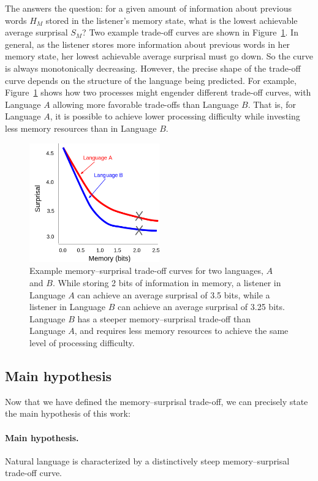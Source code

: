 The  answers the question: for a given amount of information about previous words $H_M$ stored in the listener's memory state, what is the lowest achievable average surprisal $S_M$? Two example trade-off curves are shown in Figure~\ref{fig:examples}. In general, as the listener stores more information about previous words in her memory state, her lowest achievable average surprisal must go down. So the curve is always monotonically decreasing. However, the precise shape of the trade-off curve depends on the structure of the language being predicted. For example, Figure~\ref{fig:examples} shows how two processes might engender different trade-off curves, with Language $A$ allowing more favorable trade-offs than Language $B$. That is, for Language $A$, it is possible to achieve lower processing difficulty while investing less memory resources than in Language $B$.

\begin{figure}
\centering
\includegraphics[width=0.5\textwidth]{figures-gdrive/tradeoff.png}
\caption{Example memory--surprisal trade-off curves for two languages, $A$ and $B$. While storing 2 bits of information in memory, a listener in Language $A$ can achieve an average surprisal of 3.5 bits, while a listener in Language $B$ can achieve an average surprisal of 3.25 bits. Language $B$ has a steeper memory--surprisal trade-off than Language $A$, and requires less memory resources to achieve the same level of processing difficulty.}
\label{fig:examples}
\end{figure}

\subsection{Main hypothesis}

Now that we have defined the memory--surprisal trade-off, we can precisely state the main hypothesis of this work:
\paragraph{Main hypothesis.}  Natural language is characterized by a distinctively steep memory--surprisal trade-off curve.


